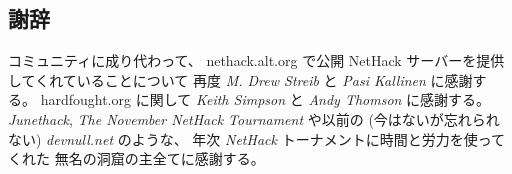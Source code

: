 \subsection*{謝辞}
 コミュニティに成り代わって、
nethack.alt.org で公開 NetHack サーバーを提供してくれていることについて
再度 {\it M. Drew Streib} と {\it Pasi Kallinen} に感謝する。
hardfought.org に関して {\it Keith Simpson} と
{\it Andy Thomson} に感謝する。
{\it Junethack}, {\it The November NetHack Tournament} や以前の
(今はないが忘れられない) {\it devnull.net\/} のような、
年次 {\it NetHack\/} トーナメントに時間と労力を使ってくれた
無名の洞窟の主全てに感謝する。
\clearpage

